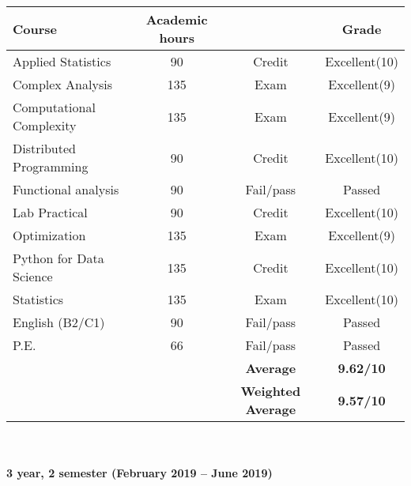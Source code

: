 \documentclass[11pt, a4paper]{report}
\begin{document}
\begin{tabular}{|p{6cm}|c|c|c|}
	\hline
	\rowcolor{LightCyan}
	\textbf{Course}&\textbf{Academic hours}&&\textbf{Grade}\\
	\hline
	Applied  Statistics & 90 & Credit & Excellent(10)\\
	Complex Analysis & 135 & Exam &  Excellent(9)\\
	Computational Complexity & 135 & Exam & Excellent(9)\\
	Distributed Programming & 90 & Credit & Excellent(10)\\
	Functional analysis & 90 & Fail/pass & Passed\\
	Lab Practical & 90 & Credit & Excellent(10)\\
	Optimization & 135 & Exam & Excellent(9)\\
	Python for Data Science & 135 & Credit & Excellent(10)\\
	Statistics & 135 & Exam & Excellent(10) \\
	English (B2/C1) & 90 & Fail/pass & Passed\\
	P.E. & 66 & Fail/pass & Passed\\
	\hline
	\rowcolor{LightCyan}
	&& \textbf{Average} & \textbf{9.62/10}\\
	\rowcolor{LightCyan}
	\hline
	&& \textbf{Weighted Average} & \textbf{9.57/10}\\
	\hline
\end{tabular}\\ \\
\newpage
\textbf{3 year, 2 semester (February 2019 -- June 2019)}\\ \\
\end{document}
